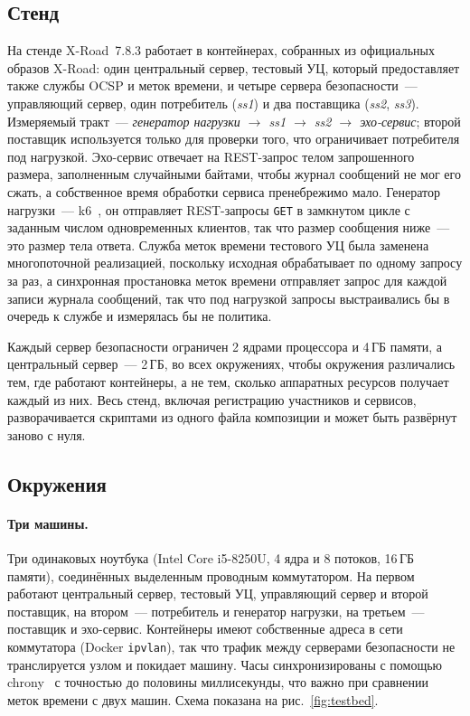 \documentclass[conference,a4paper]{IEEEtran}
\newcommand{\newtext}[1]{{\color{blue}#1}}
\begin{document}
\subsection{Стенд}\label{sec:testbed}

На стенде X-Road~7.8.3 работает в контейнерах, собранных из официальных образов X-Road: один центральный сервер,
тестовый УЦ, который предоставляет также службы OCSP и меток времени, и четыре сервера безопасности~---
управляющий сервер, один потребитель (\emph{ss1}) и два поставщика (\emph{ss2}, \emph{ss3}). Измеряемый
тракт~--- \emph{генератор нагрузки $\rightarrow$ ss1 $\rightarrow$ ss2 $\rightarrow$ эхо-сервис}; второй
поставщик используется только для проверки того, что ограничивает потребителя под нагрузкой. Эхо-сервис отвечает на
REST-запрос телом запрошенного размера, заполненным случайными байтами, чтобы журнал сообщений не мог
его сжать, а собственное время обработки сервиса пренебрежимо мало. Генератор нагрузки~--- k6\newtext{~\cite{k6}}, он отправляет REST-запросы
\texttt{GET} в замкнутом цикле с заданным числом одновременных клиентов, так что размер сообщения
ниже~--- это размер тела ответа. Служба меток времени тестового УЦ была заменена
многопоточной реализацией, поскольку исходная обрабатывает по одному запросу за раз\newtext{, а
синхронная простановка меток времени отправляет запрос для каждой записи журнала сообщений, так что под нагрузкой
запросы выстраивались бы в очередь к службе и измерялась бы не политика}.

Каждый сервер безопасности ограничен 2 ядрами процессора и 4\,ГБ памяти, а центральный сервер~--- 2\,ГБ,
во всех окружениях, чтобы окружения различались тем, где работают контейнеры, а не тем, сколько
аппаратных ресурсов получает каждый из них. Весь стенд, включая регистрацию участников и сервисов,
разворачивается скриптами из одного файла композиции и может быть развёрнут заново с нуля.

\subsection{Окружения}

\paragraph{Три машины.} Три одинаковых ноутбука (Intel Core i5-8250U, 4 ядра и 8 потоков,
16\,ГБ памяти), соединённых выделенным проводным коммутатором. На первом работают центральный сервер, тестовый
УЦ, управляющий сервер и второй поставщик, на втором~--- потребитель и генератор
нагрузки, на третьем~--- поставщик и эхо-сервис. Контейнеры имеют собственные
адреса в сети коммутатора (Docker \texttt{ipvlan}), так что трафик между серверами
безопасности не транслируется узлом и покидает машину. Часы синхронизированы с помощью chrony\newtext{~\cite{chrony}} с точностью
до половины миллисекунды, что важно при сравнении меток времени с двух машин.
Схема показана на рис.~\ref{fig:testbed}.
\end{document}

